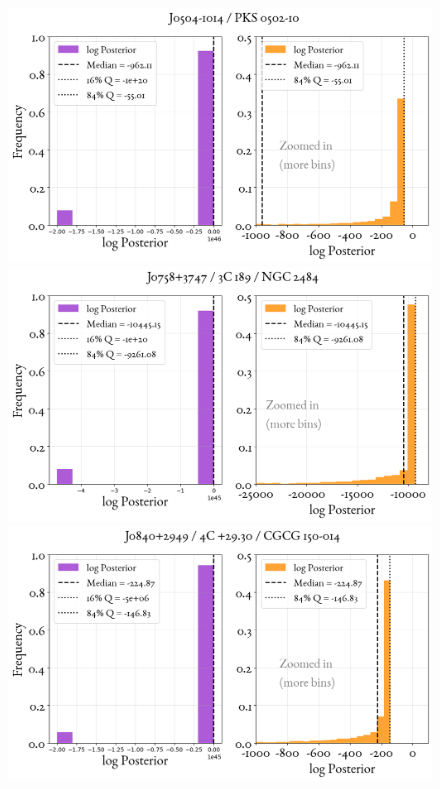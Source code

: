 \begin{figure}
    \centering
    \includegraphics[width=0.8\linewidth]{figures/ResultPosteriors/19_Posterior_1765.png}\\
     \includegraphics[width=0.8\linewidth]{figures/ResultPosteriors/25_Posterior_1971.png}\\
      \includegraphics[width=0.8\linewidth]{figures/ResultPosteriors/28_Posterior_2029.png}  
\end{figure}

